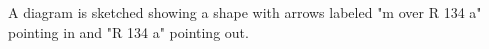 A diagram is sketched showing a shape with arrows labeled "m over R 134 a" pointing in and "R 134 a" pointing out.